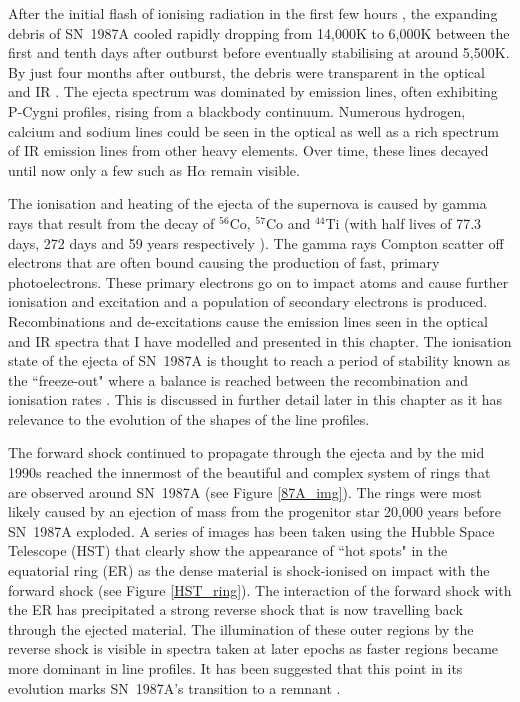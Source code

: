 After the initial flash of ionising radiation in the first few hours \citep{Ensman1992}, the expanding debris of SN~1987A cooled rapidly dropping from 14,000K to 6,000K between the first and tenth days after outburst \citep{Kirshner1987} before eventually stabilising at around 5,500K.  By just four months after outburst, the debris were transparent in the optical and IR \citep{McCray1993}.  The ejecta spectrum was dominated by emission lines, often exhibiting P-Cygni profiles, rising from a blackbody continuum.  Numerous hydrogen, calcium and sodium lines could be seen in the optical as well as a rich spectrum of IR emission lines  from other heavy elements.  Over time, these lines decayed until now only a few such as H$\alpha$ remain visible.  

The ionisation and heating of the ejecta of the supernova is caused by gamma rays that result from the decay of $^{56}$Co, $^{57}$Co and $^{44}$Ti (with half lives of 77.3 days, 272 days and 59 years respectively \citep{Manuel2002}).  The gamma rays Compton scatter off electrons that are often bound causing the production of fast, primary photoelectrons. These primary electrons go on to impact atoms and cause further ionisation and excitation and a population of secondary electrons is produced.  Recombinations and de-excitations cause the emission lines seen in the optical and IR spectra that I have modelled and presented in this chapter.  The ionisation state of the ejecta of SN~1987A is thought to reach a period of stability known as the ``freeze-out" where a balance is reached between the recombination and ionisation rates \citep{Danziger1991,Kozma1998a,Fransson2013}.  This is discussed in further detail later in this chapter as it has relevance to the evolution of the shapes of the line profiles.

 The forward shock continued to propagate through the ejecta and by the mid 1990s reached the innermost of the beautiful and complex system of rings that are observed around SN~1987A (see Figure \ref{87A_img}).  The rings were most likely caused by an ejection of mass from the progenitor star 20,000 years before SN~1987A exploded.  A series of images has been taken using the Hubble Space Telescope (HST) that clearly show the appearance of ``hot spots" in the equatorial ring (ER) as the dense material is shock-ionised on impact with the forward shock (see Figure \ref{HST_ring}).  The interaction of the forward shock with the ER has precipitated a strong reverse shock that is now travelling back through the ejected material.  The illumination of these outer regions by the reverse shock is visible in spectra taken at later epochs as faster regions became more dominant in line profiles.  It has been suggested that this point in its evolution marks SN~1987A's transition to a remnant \citep{McCray1996}.


